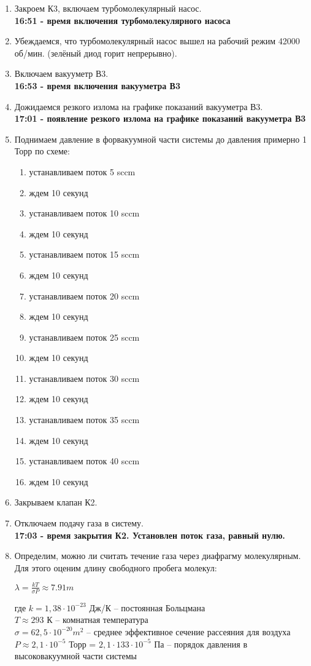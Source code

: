 \documentclass[a4paper]{article}
\begin{document}
\begin{enumerate}
\item Закроем К3, включаем турбомолекулярный насос.\\
\textbf{16:51 - время включения турбомолекулярного насоса}
\item Убеждаемся, что турбомолекулярный насос вышел на рабочий режим  42000 об/мин. (зелёный диод горит непрерывно).
\item Включаем вакууметр В3.\\
\textbf{ 16:53 - время включения вакууметра В3}
\item Дожидаемся резкого излома на графике показаний вакууметра В3.\\
\textbf{17:01 - появление резкого излома на графике показаний вакууметра В3}
\item Поднимаем давление в форвакуумной части системы до давления примерно 1 Торр по схеме:
\begin{enumerate}
\item устанавливаем поток 5 sccm
\item ждем 10 секунд
\item устанавливаем поток 10 sccm
\item ждем 10 секунд
\item устанавливаем поток 15 sccm
\item ждем 10 секунд
\item устанавливаем поток 20 sccm
\item ждем 10 секунд
\item устанавливаем поток 25 sccm
\item ждем 10 секунд
\item устанавливаем поток 30 sccm
\item ждем 10 секунд
\item устанавливаем поток 35 sccm
\item ждем 10 секунд
\item устанавливаем поток 40 sccm
\item ждем 10 секунд
\end{enumerate}
\item Закрываем клапан К2.
\item Отключаем подачу газа в систему.\\
\textbf{17:03 - время закрытия К2. Установлен поток газа, равный нулю.}
\item Определим, можно ли считать течение газа через диафрагму молекулярным. Для этого оценим длину свободного пробега молекул:
\begin{center}
$\lambda = \frac{kT}{\sigma P} \approx 7.91m$
\end{center}
где $k = 1,38 \cdot 10^{-23}$ Дж/К – постоянная Больцмана\\
      $T \approx 293$ К – комнатная температура\\
       $\sigma = 62,5 \cdot 10^{-20} m^2$ – среднее эффективное сечение рассеяния для воздуха\\
       $P \approx 2,1 \cdot 10^{-5}$ Торр = $2,1 \cdot 133 \cdot 10^{-5}$ Па – порядок давления в высоковакуумной части системы\\


\end{enumerate}
\end{document}
